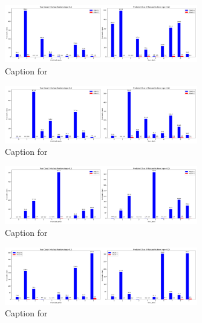 \documentclass{article}
\begin{document}
\begin{figure}[!htbp]
\centering
\includegraphics[width=0.75\textwidth]{combined_class_boundary_pgd/combined_class_2_misclassifications_eps_0.2.png}
\caption{Caption for }
\label{fig:combined_class_2_misclassifications_eps_0.2.png}
\end{figure}

\begin{figure}[!htbp]
\centering
\includegraphics[width=0.75\textwidth]{combined_class_boundary_pgd/combined_class_1_misclassifications_eps_0.2.png}
\caption{Caption for }
\label{fig:combined_class_1_misclassifications_eps_0.2.png}
\end{figure}

\begin{figure}[!htbp]
\centering
\includegraphics[width=0.75\textwidth]{combined_class_boundary_pgd/combined_class_3_misclassifications_eps_0.2.png}
\caption{Caption for }
\label{fig:combined_class_3_misclassifications_eps_0.2.png}
\end{figure}

\begin{figure}[!htbp]
\centering
\includegraphics[width=0.75\textwidth]{combined_class_boundary_pgd/combined_class_4_misclassifications_eps_0.2.png}
\caption{Caption for }
\label{fig:combined_class_4_misclassifications_eps_0.2.png}
\end{figure}
\end{document}
